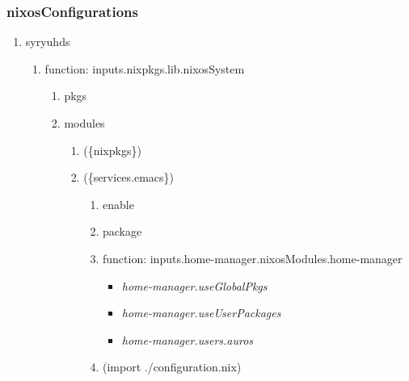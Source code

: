 \documentclass[11pt]{article}
\begin{document}
\subsubsection{nixosConfigurations}
\label{sec:org5801c0a}
\begin{enumerate}
\item syryuhds
\label{sec:org1931c6b}
\begin{enumerate}
\item function:  inputs.nixpkgs.lib.nixosSystem
\label{sec:org3ac1853}
\begin{enumerate}
\item pkgs
\label{sec:orgbd967bf}
\item modules
\label{sec:orgcdb1f36}
\begin{enumerate}
\item (\{nixpkgs\})
\label{sec:org87b8dbc}
\item (\{services.emacs\})
\label{sec:org3a7ae94}
\begin{enumerate}
\item enable
\label{sec:org950fb2c}
\item package
\label{sec:org119eeba}
\item function: inputs.home-manager.nixosModules.home-manager
\label{sec:orgfbe64d7}
\begin{itemize}
\item \emph{home-manager.useGlobalPkgs}
\item \emph{home-manager.useUserPackages}
\item \emph{home-manager.users.auros}
\end{itemize}
\item (import ./configuration.nix)
\label{sec:org2695996}
\end{enumerate}
\end{enumerate}
\end{enumerate}
\end{enumerate}
\end{enumerate}
\end{document}
